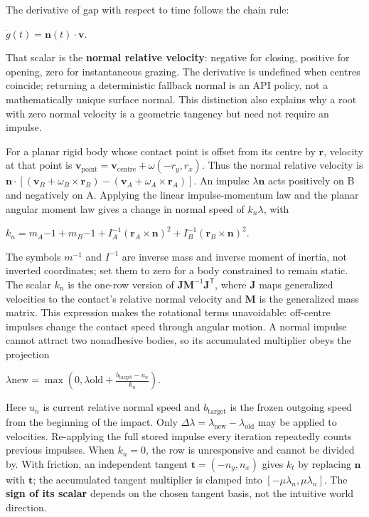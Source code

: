 The derivative of gap with respect to time follows the chain rule:

\(\dot g(t)=\mathbf n(t)\cdot\mathbf v.\)

That scalar is the \textbf{normal relative velocity}: negative for closing, positive for opening, zero for instantaneous grazing. The derivative is undefined when centres coincide; returning a deterministic fallback normal is an API policy, not a mathematically unique surface normal. This distinction also explains why a root with zero normal velocity is a geometric tangency but need not require an impulse.

For a planar rigid body whose contact point is offset from its centre by \(\mathbf r\), velocity at that point is \(\mathbf v_{\text{point}}=\mathbf v_{\text{centre}}+\omega(-r_y,r_x)\). Thus the normal relative velocity is \(\mathbf n\cdot[(\mathbf v_B+\omega_B\times\mathbf r_B)-(\mathbf v_A+\omega_A\times\mathbf r_A)]\). An impulse \(\lambda\mathbf n\) acts positively on B and negatively on A. Applying the linear impulse-momentum law and the planar angular moment law gives a change in normal speed of \(k_n\lambda\), with

\(k_n=m_A{-1}+m_B{-1} +I_A^{-1}(\mathbf r_A\times\mathbf n)^2 +I_B^{-1}(\mathbf r_B\times\mathbf n)^2.\)

The symbols \(m^{-1}\) and \(I^{-1}\) are inverse mass and inverse moment of inertia, not inverted coordinates; set them to zero for a body constrained to remain static. The scalar \(k_n\) is the one-row version of \(\mathbf J\mathbf M^{-1}\mathbf J^\mathsf T\), where \(\mathbf J\) maps generalized velocities to the contact's relative normal velocity and \(\mathbf M\) is the generalized mass matrix. This expression makes the rotational terms unavoidable: off-centre impulses change the contact speed through angular motion. A normal impulse cannot attract two nonadhesive bodies, so its accumulated multiplier obeys the projection

\(\lambda{\mathrm{new}} =\max\left(0,\lambda{\mathrm{old}}+ \frac{b_{\mathrm{target}}-u_n}{k_n}\right).\)

Here \(u_n\) is current relative normal speed and \(b_{\mathrm{target}}\) is the frozen outgoing speed from the beginning of the impact. Only \(\Delta\lambda=\lambda_{\mathrm{new}}-\lambda_{\mathrm{old}}\) may be applied to velocities. Re-applying the full stored impulse every iteration repeatedly counts previous impulses. When \(k_n=0\), the row is unresponsive and cannot be divided by. With friction, an independent tangent \(\mathbf t=(-n_y,n_x)\) gives \(k_t\) by replacing \(\mathbf n\) with \(\mathbf t\); the accumulated tangent multiplier is clamped into \([-\mu\lambda_n,\mu\lambda_n]\). The \textbf{sign of its scalar} depends on the chosen tangent basis, not the intuitive world direction.

